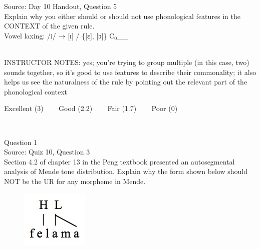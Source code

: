 \documentclass[12pt]{article}
\begin{document}
Source: Day 10 Handout, Question 5\\

Explain why you either should or should not use phonological features in the CONTEXT of the given rule.\\

Vowel laxing: /i/ → {[ɪ]} / \{{[ɛ]}, {[ɔ]}\} C$_0$\_\_


~\\
INSTRUCTOR NOTES: yes; you're trying to group multiple (in this case, two) sounds together, so it's good to use features to describe their commonality; it also helps us see the naturalness of the rule by pointing out the relevant part of the phonological context


\vfill
Excellent (3) ~~~ Good (2.2) ~~~ Fair (1.7) ~~~ Poor (0)
\newpage

\begin{center}
\textbf{{\color{red}{\HUGE END OF EXAM}}}\\

\end{center}
\newpage

\begin{center}
\textbf{{\color{blue}{\HUGE START OF EXAM\\}}}

\textbf{{\color{blue}{\HUGE Student ID: 8951\\}}}

\textbf{{\color{blue}{\HUGE 4:40 - 5:00 PM\\}}}

\end{center}
\newpage

{\large Question 1}\\

Source: Quiz 10, Question 3\\

Section 4.2 of chapter 13 in the Peng textbook presented an autosegmental analysis of Mende tone distribution. Explain why the form shown below should NOT be the UR for any morpheme in Mende.\\

\begin{figure}[H]
\includegraphics{../images/mende_junction_d.png}
\end{figure}
\end{document}
